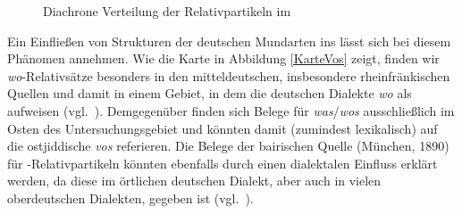 \begin{figure}
	\caption{Diachrone Verteilung der Relativpartikeln im }
	\label{histoVOS}	
\end{figure}


\newpage
Ein Einfließen von Strukturen der deutschen Mundarten ins  lässt sich bei diesem Phänomen annehmen. Wie die Karte in Abbildung \ref{KarteVos} zeigt, finden wir \textit{wo}-Relativsätze \mbox{besonders} in den mitteldeutschen, insbesondere rheinfränkischen Quellen und damit in einem Gebiet, in dem die deutschen Dialekte \textit{wo} als  aufweisen (vgl.\, \citealt{Weise1917,Fleischer2004c,Fleischer2004d,Fleischer2010}). Demgegenüber finden sich Belege für \textit{was}/\textit{wos} ausschließlich im Osten des Untersuchungsgebiet und könnten damit (zumindest lexikalisch) auf die ostjiddische  \textit{vos} referieren. Die Belege der bairischen Quelle  (München, 1890) für -Relativpartikeln könnten ebenfalls durch einen dialektalen Einfluss erklärt werden, da diese  im örtlichen deutschen Dialekt, aber auch in vielen oberdeutschen Dialekten, gegeben ist (vgl.\, \citealt{Weise1917,Fleischer2004c,Fleischer2004d,Fleischer2010}). 
 
